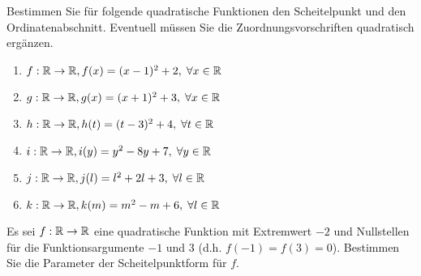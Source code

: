 \documentclass[12pt]{article}
\begin{document}
\begin{exercise}\label{ex:scheitelpunkt_und_ordinatenabschnitt}
Bestimmen Sie für folgende quadratische Funktionen den Scheitelpunkt und den Ordinatenabschnitt. Eventuell müssen Sie die Zuordnungsvorschriften quadratisch ergänzen.
\begin{enumerate}[label=\alph*)]
\item $f: \mathbb{R} \rightarrow \mathbb{R}, f(x) = (x-1)^2 + 2, \; \forall x \in \mathbb{R}$
\item $g: \mathbb{R} \rightarrow \mathbb{R}, g(x) = (x+1)^2 + 3, \; \forall x \in \mathbb{R}$
\item $h: \mathbb{R} \rightarrow \mathbb{R}, h(t) = (t-3)^2 + 4, \; \forall t \in \mathbb{R}$
\item $i: \mathbb{R} \rightarrow \mathbb{R}, i(y) = y^2 - 8y + 7, \; \forall y \in \mathbb{R}$
\item $j: \mathbb{R} \rightarrow \mathbb{R}, j(l) = l^2 + 2l + 3, \; \forall l \in \mathbb{R}$
\item $k: \mathbb{R} \rightarrow \mathbb{R}, k(m) = m^2 - m + 6, \; \forall l \in \mathbb{R}$
\end{enumerate} 
\end{exercise}

\begin{exercise}\label{ex:scheitelpunktform_von_nullstellen}
Es sei $f: \mathbb{R} \rightarrow \mathbb{R}$ eine quadratische Funktion mit Extremwert $-2$ und Nullstellen für die Funktionsargumente $-1$ und $3$ (d.h. $f(-1) = f(3) = 0$). Bestimmen Sie die Parameter der Scheitelpunktform für $f$.
\end{exercise}
\end{document}
